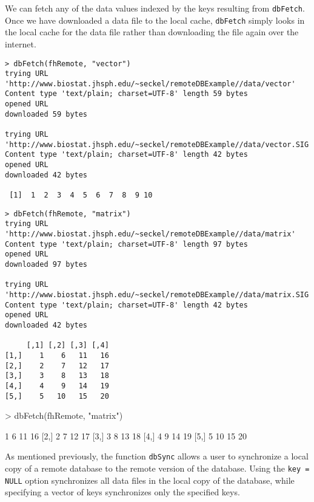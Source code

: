 \documentclass{article}
\newcommand{\code}{\texttt}
\begin{document}
\noindent 

\noindent We can fetch any of the data values indexed by the keys resulting 
from \code{dbFetch}. Once we have downloaded a data file to the local cache,
\code{dbFetch} simply looks in the local cache for the data file rather than
downloading the file again over the internet. 

\begin{verbatim}
> dbFetch(fhRemote, "vector") 
trying URL 'http://www.biostat.jhsph.edu/~seckel/remoteDBExample//data/vector'
Content type 'text/plain; charset=UTF-8' length 59 bytes
opened URL
downloaded 59 bytes

trying URL 'http://www.biostat.jhsph.edu/~seckel/remoteDBExample//data/vector.SIG'
Content type 'text/plain; charset=UTF-8' length 42 bytes
opened URL
downloaded 42 bytes

 [1]  1  2  3  4  5  6  7  8  9 10
\end{verbatim}

\begin{verbatim}
> dbFetch(fhRemote, "matrix") 
trying URL 'http://www.biostat.jhsph.edu/~seckel/remoteDBExample//data/matrix'
Content type 'text/plain; charset=UTF-8' length 97 bytes
opened URL
downloaded 97 bytes

trying URL 'http://www.biostat.jhsph.edu/~seckel/remoteDBExample//data/matrix.SIG'
Content type 'text/plain; charset=UTF-8' length 42 bytes
opened URL
downloaded 42 bytes

     [,1] [,2] [,3] [,4]
[1,]    1    6   11   16
[2,]    2    7   12   17
[3,]    3    8   13   18
[4,]    4    9   14   19
[5,]    5   10   15   20
\end{verbatim}

\begin{Schunk}
\begin{Sinput}
> dbFetch(fhRemote, "matrix")
\end{Sinput}
\begin{Soutput}
     [,1] [,2] [,3] [,4]
[1,]    1    6   11   16
[2,]    2    7   12   17
[3,]    3    8   13   18
[4,]    4    9   14   19
[5,]    5   10   15   20
\end{Soutput}
\end{Schunk}

\noindent As mentioned previously, the function \code{dbSync} allows
a user to synchronize a local copy of a remote database to the remote version
of the database. Using the \code{key = NULL} option synchronizes all data files
in the local copy of the database, while specifying a vector of keys
synchronizes only the specified keys. 
\end{document}
